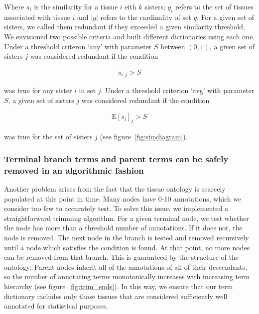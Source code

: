 \documentclass[linenumbers, doublespacing]{bmcart}
\begin{document}
Where $s_i$ is the similarity for a tissue $i$ eith $k$ sisters; $g_i$ refers to the set of tissues associated with tissue $i$ and $|g|$ refers to the cardinality of set $g$. For a given set of sisters, we called them redundant if they exceeded a given similarity threshold. We envisioned two possible criteria and built different dictionaries using each one. Under a threshold criteron `any' with parameter $S$ between $(0, 1)$, a given set of sisters $j$ was considered redundant if the condition 

\begin{eqnarray}\label{any threshold}
	s_{i, j} > S
\end{eqnarray}

was true for any sister $i$ in set $j$. Under a threshold criterion `avg' with parameter $S$, a given set of sisters $j$ was considered redundant if the condition

\begin{eqnarray}\label{avg threshold}
	\mathrm{E}[s_i]_j > S
\end{eqnarray}

was true for the set of sisters $j$ (see figure~\ref{fig:simdiagram}).

\subsubsection*{Terminal branch terms and parent terms can be safely removed in an algorithmic fashion }
Another problem arises from the fact that the tissue ontology is scarcely populated at this point in time. Many nodes have 0-10 annotations, which we consider too few to accurately test. To solve this issue, we implemented a straightforward trimming algorithm. For a given terminal node, we test whether the node has more than a threshold number of annotations. If it does not, the node is removed. The next node in the branch is tested and removed recursively until a node which satisfies the condition is found. At that point, no more nodes can be removed from that branch. This is guaranteed by the structure of the ontology: Parent nodes inherit all of the annotations of all of their descendants, so the number of annotating terms monotonically increases with increasing term hierarchy (see figure~\ref{fig:trim_ends}). In this way, we ensure that our term dictionary includes only those tissues that are considered sufficiently well annotated for statistical purposes. 
\end{document}
